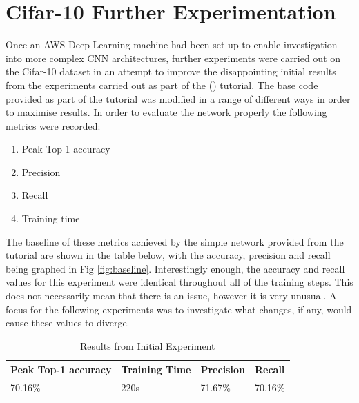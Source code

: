 \documentclass[12pt]{report}
\begin{document}
\chapter{Cifar-10 Further Experimentation}
\begin{flushleft}
Once an AWS Deep Learning machine had been set up to enable investigation into more complex CNN architectures, further experiments were carried out on the Cifar-10 dataset in an attempt to improve the disappointing initial results from the experiments carried out as part of the (\cite{udemy}) tutorial. The base code provided as part of the tutorial was modified in a range of different ways in order to maximise results. In order to evaluate the network properly the following metrics were recorded:

\begin{enumerate}
  \item Peak Top-1 accuracy
  \item Precision
  \item Recall
  \item Training time
\end{enumerate}

The baseline of these metrics achieved by the simple network provided from the tutorial are shown in the table below, with the accuracy, precision and recall being graphed in Fig \ref{fig:baseline}. Interestingly enough, the accuracy and recall values for this experiment were identical throughout all of the training steps. This does not necessarily mean that there is an issue, however it is very unusual. A focus for the following experiments was to investigate what changes, if any, would cause these values to diverge.
\end{flushleft}

\vspace{0.5cm}
\begin{table}[ht!]
\begin{tabular}{llll}
\\ \hline
\multicolumn{1}{|l|}{Peak Top-1 accuracy} & \multicolumn{1}{l|}{Training Time} & \multicolumn{1}{l|}{Precision} & \multicolumn{1}{l|}{Recall}  \\ \hline
\multicolumn{1}{|l|}{70.16\%}             & \multicolumn{1}{l|}{220s}          & \multicolumn{1}{l|}{71.67\%}   & \multicolumn{1}{l|}{70.16\%} \\ \hline
\end{tabular}
\caption{Results from Initial Experiment}
\end{table}
\end{document}
